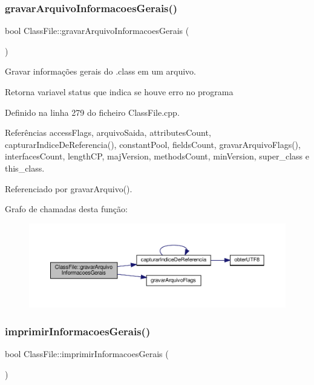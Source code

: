 \subsubsection{\texorpdfstring{gravar\+Arquivo\+Informacoes\+Gerais()}{gravarArquivoInformacoesGerais()}}
{\footnotesize\ttfamily bool Class\+File\+::gravar\+Arquivo\+Informacoes\+Gerais (\begin{DoxyParamCaption}{ }\end{DoxyParamCaption})}



Gravar informações gerais do .class em um arquivo. 

\begin{DoxyReturn}{Retorna}
variavel status que indica se houve erro no programa 
\end{DoxyReturn}


Definido na linha 279 do ficheiro Class\+File.\+cpp.



Referências access\+Flags, arquivo\+Saida, attributes\+Count, capturar\+Indice\+De\+Referencia(), constant\+Pool, fields\+Count, gravar\+Arquivo\+Flags(), interfaces\+Count, length\+CP, maj\+Version, methods\+Count, min\+Version, super\+\_\+class e this\+\_\+class.



Referenciado por gravar\+Arquivo().

Grafo de chamadas desta função\+:
\nopagebreak
\begin{figure}[H]
\begin{center}
\leavevmode
\includegraphics[width=350pt]{classClassFile_a4a685afd10dc5aaacd5a71ed535895c6_cgraph}
\end{center}
\end{figure}
\mbox{\label{classClassFile_a482ed64fcd8a1b79d3622b3f59b5767a}} 
\subsubsection{\texorpdfstring{imprimir\+Informacoes\+Gerais()}{imprimirInformacoesGerais()}}
{\footnotesize\ttfamily bool Class\+File\+::imprimir\+Informacoes\+Gerais (\begin{DoxyParamCaption}{ }\end{DoxyParamCaption})}




